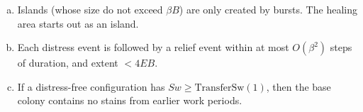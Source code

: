 \documentclass[12pt]{memoir}
\newcommand{\fld}[1]{\ensuremath{\textit{#1}}}
\def\B{B}
\newcommand{\E}{E}
\newcommand{\Noise}{\mathit{Noise}}
\newcommand{\Sweep}{\fld{Sw}}
\newcommand{\TransferSw}{\mathrm{TransferSw}}
\newcommand{\mrk}{\mathrm{mrk}}
\newcommand{\loc}{\ell_\mrk}
\begin{document}
\begin{definition}
\begin{enumerate}[(a)]
        \item \label{i:annotated-hist.progress}
            Islands (whose size do not exceed \( \beta\B \))
            are only created
            by bursts.
            The healing area starts out as an island.




        \item\label{i:annotated-hist.distress}
            Each distress event is followed by a relief event within at most \( O(\beta^{2}) \) %
            steps of duration, and extent \( <4\E\B \).

        \item\label{i:annotated-hist.stain}
            If a distress-free configuration has
            \( \Sweep \ge \TransferSw(1) \),
            then the base colony contains no stains
            from earlier work periods.
        \end{enumerate}
\end{definition}




%
%
\end{document}
